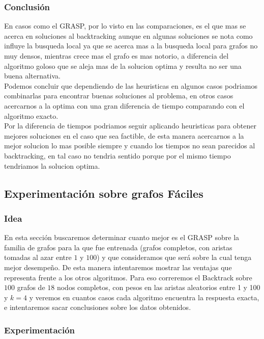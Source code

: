 \subsubsection{Conclusión}


En casos como el GRASP, por lo visto en las comparaciones, es el que mas se acerca en soluciones al backtracking aunque en algunas soluciones se nota como influye la busqueda local ya que se acerca mas a la busqueda local para grafos no muy densos, mientras crece mas el grafo es mas notorio, a diferencia del algoritmo goloso que se aleja mas de la solucion optima y resulta no ser una buena alternativa.\\
Podemos concluir que dependiendo de las heuristicas en algunos casos podriamos combinarlas para encontrar buenas soluciones al problema, en otros casos acercarnos a la optima con una gran diferencia de tiempo comparando con el algoritmo exacto. \\ Por la diferencia de tiempos podriamos seguir aplicando heuristicas para obtener mejores soluciones en el caso que sea factible, de esta manera acercarnos a la mejor solucion lo mas posible siempre y cuando los tiempos no sean parecidos al backtracking, en tal caso no tendria sentido porque por el mismo tiempo tendriamos la solucion optima.


\subsection{Experimentación sobre grafos Fáciles}

\subsubsection{Idea}

En esta sección buscaremos determinar cuanto mejor es el GRASP sobre la familia de grafos para la que fue entrenada (grafos completos, con aristas tomadas al azar entre $1$ y $100$) y que consideramos que será sobre la cual tenga mejor desempeño. De esta manera intentaremos mostrar las ventajas que representa frente a los otros algoritmos. Para eso correremos el Backtrack sobre $100$ grafos de $18$ nodos completos, con pesos en las aristas aleatorios entre 1 y 100 y $k = 4$ y veremos en cuantos casos cada algoritmo encuentra la respuesta exacta, e intentaremos sacar conclusiones sobre los datos obtenidos.

\subsubsection{Experimentación}

